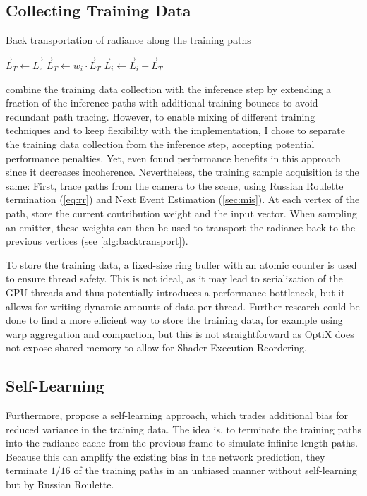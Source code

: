 \subsection{Collecting Training Data}
\begin{algorithm}
    \caption{Back transportation of radiance along the training paths}
    \label{alg:backtransport}
    \begin{algorithmic}
        \State $\vec{L}_T \gets \vec{L_e}$
            \State $\vec{L}_T \gets w_i \cdot \vec{L}_T$ 
            \State $\vec{L}_i \gets \vec{L}_i + \vec{L}_T$ 
        \EndFor
    \end{algorithmic}
\end{algorithm}
\textcite{muller2021} combine the training data collection with the inference step by extending a fraction of the inference paths with additional training bounces to avoid redundant path tracing.
However, to enable mixing of different training techniques and to keep flexibility with the implementation, I chose to separate the training data collection from the inference step, accepting potential performance penalties.
Yet, \textcite{dereviannykh2024} even found performance benefits in this approach since it decreases incoherence.
Nevertheless, the training sample acquisition is the same:
First, trace paths from the camera to the scene, using Russian Roulette termination (\cref{eq:rr}) and Next Event Estimation (\cref{sec:mis}).
At each vertex of the path, store the current contribution weight and the input vector.
When sampling an emitter, these weights can then be used to transport the radiance back to the previous vertices (see \cref{alg:backtransport}).

To store the training data, a fixed-size ring buffer with an atomic counter is used to ensure thread safety.
This is not ideal, as it may lead to serialization of the GPU threads and thus potentially introduces a performance bottleneck, but it allows for writing dynamic amounts of data per thread.
Further research could be done to find a more efficient way to store the training data, for example using warp aggregation and compaction, but this is not straightforward as OptiX does not expose shared memory to allow for Shader Execution Reordering.

\subsection{Self-Learning}
Furthermore, \textcite{muller2021} propose a self-learning approach, which trades additional bias for reduced variance in the training data.
The idea is, to terminate the training paths into the radiance cache from the previous frame to simulate infinite length paths.
Because this can amplify the existing bias in the network prediction, they terminate $1/16$ of the training paths in an unbiased manner without self-learning but by Russian Roulette.

